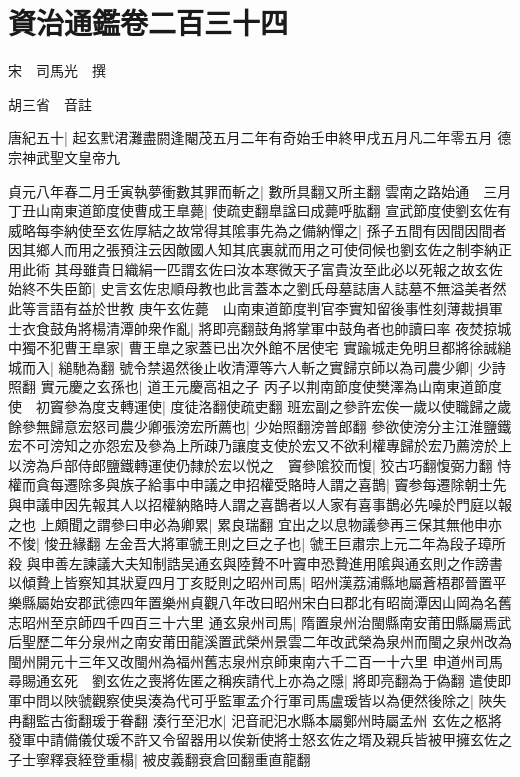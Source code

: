 \chapter{資治通鑑卷二百三十四}
宋　司馬光　撰

胡三省　音註

唐紀五十|{
	起玄黓涒灘盡閼逢閹茂五月二年有奇始壬申終甲戌五月凡二年零五月}
德宗神武聖文皇帝九

貞元八年春二月壬寅執夢衝數其罪而斬之|{
	數所具翻又所主翻}
雲南之路始通　三月丁丑山南東道節度使曹成王臯薨|{
	使疏吏翻臯諡曰成薨呼肱翻}
宣武節度使劉玄佐有威略每李納使至玄佐厚結之故常得其隂事先為之備納憚之|{
	孫子五間有因間因間者因其鄉人而用之張預注云因敵國人知其㡳裏就而用之可使伺候也劉玄佐之制李納正用此術}
其母雖貴日織絹一匹謂玄佐曰汝本寒微天子富貴汝至此必以死報之故玄佐始終不失臣節|{
	史言玄佐忠順母教也此言蓋本之劉氏母墓誌唐人誌墓不無溢美者然此等言語有益於世教}
庚午玄佐薨　山南東道節度判官李實知留後事性刻薄裁損軍士衣食鼓角將楊清潭帥衆作亂|{
	將即亮翻鼓角將掌軍中鼓角者也帥讀曰率}
夜焚掠城中獨不犯曹王臯家|{
	曹王臯之家蓋已出次外館不居使宅}
實踰城走免明旦都將徐誠縋城而入|{
	縋馳為翻}
號令禁遏然後止收清潭等六人斬之實歸京師以為司農少卿|{
	少詩照翻}
實元慶之玄孫也|{
	道王元慶高祖之子}
丙子以荆南節度使樊澤為山南東道節度使　初竇參為度支轉運使|{
	度徒洛翻使疏吏翻}
班宏副之參許宏俟一歲以使職歸之歲餘參無歸意宏怒司農少卿張滂宏所薦也|{
	少始照翻滂普郎翻}
參欲使滂分主江淮鹽鐵宏不可滂知之亦怨宏及參為上所疎乃讓度支使於宏又不欲利權專歸於宏乃薦滂於上以滂為戶部侍郎鹽鐵轉運使仍隸於宏以悦之　竇參隂狡而愎|{
	狡古巧翻愎弼力翻}
恃權而貪每遷除多與族子給事中申議之申招權受賂時人謂之喜鵲|{
	竇参每遷除朝士先與申議申因先報其人以招權納賂時人謂之喜鵲者以人家有喜事鵲必先噪於門庭以報之也}
上頗聞之謂參曰申必為卿累|{
	累良瑞翻}
宜出之以息物議參再三保其無他申亦不悛|{
	悛丑緣翻}
左金吾大將軍虢王則之巨之子也|{
	虢王巨肅宗上元二年為段子璋所殺}
與申善左諫議大夫知制誥吴通玄與陸贄不叶竇申恐贄進用隂與通玄則之作謗書以傾贄上皆察知其狀夏四月丁亥貶則之昭州司馬|{
	昭州漢荔浦縣地屬蒼梧郡晉置平樂縣屬始安郡武德四年置樂州貞觀八年改曰昭州宋白曰郡北有昭崗潭因山岡為名舊志昭州至京師四千四百三十六里}
通玄泉州司馬|{
	隋置泉州治閩縣南安莆田縣屬焉武后聖歷二年分泉州之南安莆田龍溪置武榮州景雲二年改武榮為泉州而閩之泉州改為閩州開元十三年又改閩州為福州舊志泉州京師東南六千二百一十六里}
申道州司馬尋賜通玄死　劉玄佐之喪將佐匿之稱疾請代上亦為之隱|{
	將即亮翻為于偽翻}
遣使即軍中問以陜虢觀察使吳湊為代可乎監軍孟介行軍司馬盧瑗皆以為便然後除之|{
	陜失冉翻監古銜翻瑗于眷翻}
湊行至汜水|{
	汜音祀汜水縣本屬鄭州時屬孟州}
玄佐之柩將發軍中請備儀仗瑗不許又令留器用以俟新使將士怒玄佐之壻及親兵皆被甲擁玄佐之子士寧釋衰絰登重榻|{
	被皮義翻衰倉回翻重直龍翻}
